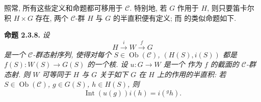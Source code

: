 照常, 所有这些定义和命题都可移用于 \(\mathscr C\).
特别地, 若 \(G\) 作用于 \(H\), 则只要笛卡尔积 \(H\times G\) 存在,
两个 \(\mathscr C\)-群 \(H\) 与 \(G\) 的半直积便有定义;
而 的类似命题如下.

\medskip
\noindent{}\textbf{命题 2.3.8.}
\textit{设
\[
  H\xrightarrow{i}W\xrightarrow{f}G
\]
是一个 \(\mathscr C\)-群态射序列, 使得对每个
\(S\in\operatorname{Ob}(\mathscr C)\), \((H(S),i(S))\) 都是
\(f(S):W(S)\to G(S)\) 的一个核. 设 \(u:G\to W\) 是一个
作为 \(f\) 的截面的 \(\mathscr C\)-群态射.
则 \(W\) 可等同于 \(H\) 与 \(G\) 关于如下 \(G\) 在 \(H\)
上的作用的半直积: 若 \(S\in\operatorname{Ob}(\mathscr C)\),
\(g\in G(S)\), \(h\in H(S)\), 则
\[
  \operatorname{Int}(u(g))i(h)=i({}^{g}h).
\]}

